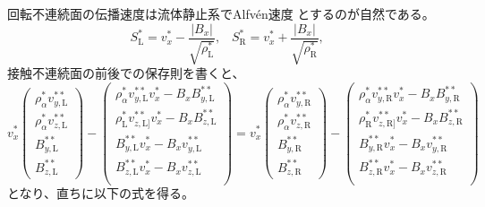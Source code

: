 回転不連続面の伝播速度は流体静止系でAlfv\'en速度
とするのが自然である。
\begin{equation}
    S^*_\mathrm{L} = v^*_x - \frac{|B_x|}{\sqrt{\rho_\mathrm{L}^*}},\;\;\;
    S^*_\mathrm{R} = v^*_x + \frac{|B_x|}{\sqrt{\rho_\mathrm{R}^*}},\;\;\;
    \label{SLRst}
\end{equation}
接触不連続面の前後での保存則を書くと、
\begin{equation}
v^*_x
    \left(
    \begin{array}{c}
       \rho_\alpha^* v^{**}_{y,\mathrm{L}}\\
       \rho_\alpha^* v^{**}_{z,\mathrm{L}} \\
       B^{**}_{y,\mathrm{L}} \\
       B^{**}_{z,\mathrm{L}} 
    \end{array}
    \right)
    - 
    \left(
    \begin{array}{c}
       \rho_\alpha^* v^{**}_{y,\mathrm{L}} v^*_{x} - B_x B^{**}_{y,\mathrm{L}}\\
       \rho_\mathrm{L}^* v^{**}_{z,\mathrm{L}]} v^*_{x} - B_x B^{**}_{z,\mathrm{L}}\\
       B^{**}_{y,\mathrm{L}} v^*_x - B_x v^{**}_{y,\mathrm{L}} \\
       B^{**}_{z,\mathrm{L}} v^*_x - B_x v^{**}_{z,\mathrm{L}} \\
    \end{array}
    \right)
    = v^*_x
    \left(
    \begin{array}{c}
       \rho_\alpha^* v^{**}_{y,\mathrm{R}}\\
       \rho_\alpha^* v^{**}_{z,\mathrm{R}} \\
       B^{**}_{y,\mathrm{R}} \\
       B^{**}_{z,\mathrm{R}} 
    \end{array}
    \right)
    - 
    \left(
    \begin{array}{c}
       \rho_\alpha^* v^{**}_{y,\mathrm{R}} v^*_{x} - B_x B^{**}_{y,\mathrm{R}}\\
       \rho_\mathrm{R}^* v^{**}_{z,\mathrm{R}]} v^*_{x} - B_x B^{**}_{z,\mathrm{R}}\\
       B^{**}_{y,\mathrm{R}} v^*_x - B_x v^{**}_{y,\mathrm{R}} \\
       B^{**}_{z,\mathrm{R}} v^*_x - B_x v^{**}_{z,\mathrm{R}} \\
    \end{array}
    \right)
\end{equation}
となり、直ちに以下の式を得る。
